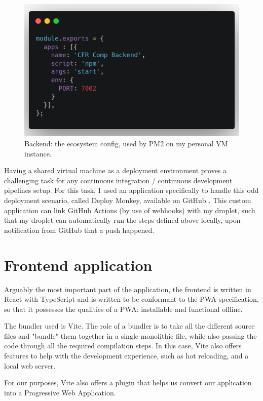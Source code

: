 \begin{figure}[htbp]
    \centering
    \includegraphics[width=.8\textwidth]{./figures/code/be_ecosystem-config.png}
    \caption{Backend: the ecosystem config, used by PM2 on my personal VM instance.}
    \label{FigBeEcosystemConfig}
\end{figure}

Having a shared virtual machine as a deployment environment proves a challenging task for any continuous integration / continuous development pipelines setup. For this task, I used an application specifically to handle this odd deployment scenario, called Deploy Monkey, available on GitHub \cite{DeployMonkey}. This custom application can link GitHub Actions (by use of webhooks) with my droplet, such that my droplet can automatically run the steps defined above locally, upon notification from GitHub that a push happened.

\section{Frontend application}
Arguably the most important part of the application, the frontend is written in React with TypeScript and is written to be conformant to the PWA specification, so that it possesses the qualities of a PWA: installable and functional offline.

The bundler used is Vite. The role of a bundler is to take all the different source files and "bundle" them together in a single monolithic file, while also passing the code through all the required compilation steps. In this case, Vite also offers features to help with the development experience, such as hot reloading, and a local web server.

For our purposes, Vite also offers a plugin that helps us convert our application into a Progressive Web Application.